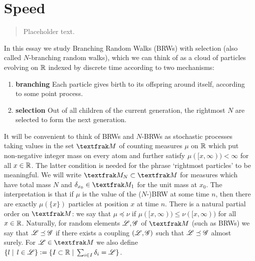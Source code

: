 \section{Speed}

\begin{quote}
{\small Placeholder text. }
\end{quote}

In this essay we study Branching Random Walks (BRWs) with selection (also called $N$-branching random walks), which we can think of as a cloud of particles evolving on $\mathbb{R}$ indexed by discrete time according to two mechanisms: 
\begin{enumerate}[1]
\item \vspace{-2mm}\textbf{branching} Each particle gives birth to its offspring around itself, according to some point process. \\
\item \vspace{-6mm}\textbf{selection} Out of all children of the current generation, the rightmost $N$ are selected to form the next generation. \\
\end{enumerate}
\vspace{-5mm}It will be convenient to think of BRWs and $N$-BRWs as stochastic processes taking values in the set $\frak{M}$ of counting measures $\mu$ on $\mathbb{R}$ which put non-negative integer mass on every atom and further satisfy $\mu([x, \infty)) < \infty$ for all $x \in \mathbb{R}$. The latter condition is needed for the phrase `rightmost particles' to be meaningful. We will write $\frak{M}_N \subset \frak{M}$ for measures which have total mass $N$ and $\delta_{x_0} \in \frak{M}_1$ for the unit mass at $x_0$. The interpretation is that if $\mu$ is the value of the ($N$-)BRW at some time $n$, then there are exactly $\mu(\{x\})$ particles at position $x$ at time $n$. There is a natural partial order on $\frak{M}$: we say that $\mu \preceq \nu$ if $\mu([x, \infty)) \leq \nu([x, \infty))$ for all $x \in \mathbb{R}$. Naturally, for random elements $\mathscr{L}, \mathscr{G}$ of $\frak{M}$ (such as BRWs) we say that $\mathscr{L} \preceq \mathscr{G}$ if there exists a coupling $(\mathscr{L}, \mathscr{G})$ such that $\mathscr{L} \preceq \mathscr{G}$ almost surely. For $\scr{L} \in \frak{M}$ we also define $\{ l \mid\,l \in \mathscr{L}\} \vcentcolon= \{ I \subset \mathbb{R} \mid\, \sum_{i \in I} \delta_{i} = \mathscr{L}\}$. \\

